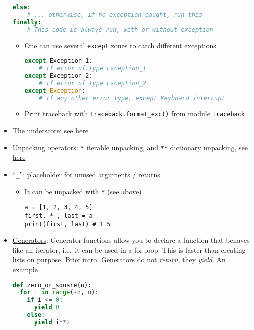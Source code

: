 \documentclass[a4paper,12pt,%
              final%
              ]{article}
\begin{document}
\begin{itemize}
\begin{lstlisting}[language=python]
else:
    # ... otherwise, if no exception caught, run this
finally:
    # This code is always run, with or without exception
\end{lstlisting}
    \begin{itemize}
      \item One can use several \texttt{except} zones to catch different exceptions
\begin{lstlisting}[language=python]
except Exception_1:
    # If error of type Exception_1
except Exception_2:
    # If error of type Exception_2
except Exception:
    # If any other error type, except Keyboard interrupt
\end{lstlisting}
      \item Print traceback with \verb|traceback.format_exc()| from module \texttt{traceback}
    \end{itemize}
  \item The underscore: see \href{https://dbader.org/blog/meaning-of-underscores-in-python}{here}
  \item Unpacking operators: \verb|*| iterable unpacking, and \verb|**| dictionary unpacking, see \href{https://geekflare.com/python-unpacking-operators/}{here}
  \item ``\verb|_|'': placeholder for unused arguments / returns
    \begin{itemize}
      \item It can be unpacked with \verb|*| (see above)
\begin{verbatim}
a = [1, 2, 3, 4, 5]
first, *_, last = a
print(first, last) # 1 5
\end{verbatim}
    \end{itemize}
  \item \href{https://wiki.python.org/moin/Generators}{Generators}: Generator functions allow you to declare a function that behaves like an iterator, i.e.~it can be used in a for loop. This is faster than creating lists on purpose. Brief \href{https://www.programiz.com/python-programming/generator}{intro}. Generators do not \emph{return}, they \emph{yield}. An example
\begin{lstlisting}[language=python]
def zero_or_square(n):
  for i in range(-n, n):
    if i <= 0:
      yield 0
    else:
      yield i**2


\end{lstlisting}
\end{itemize}
\end{document}

